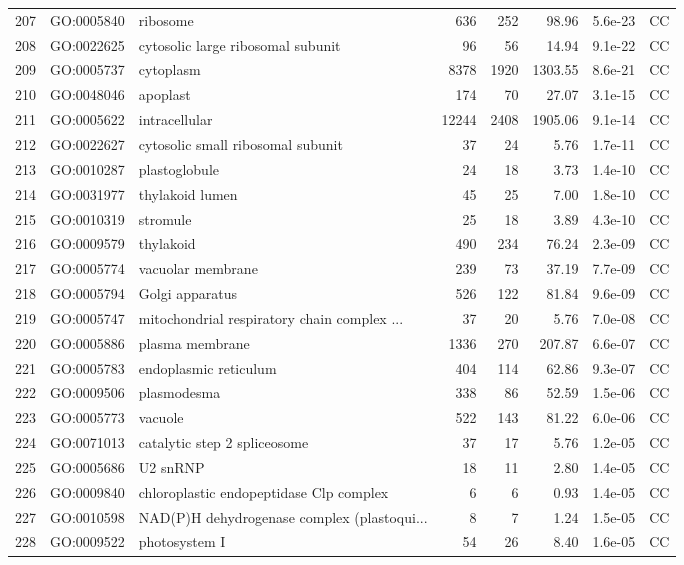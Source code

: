 \documentclass[12pt,oneside,a4paper]{article}
\begin{document}
\begin{longtable}{rllrrrll}
  207 & GO:0005840 & ribosome & 636 & 252 & 98.96 & 5.6e-23 & CC \\ 
  208 & GO:0022625 & cytosolic large ribosomal subunit &  96 &  56 & 14.94 & 9.1e-22 & CC \\ 
  209 & GO:0005737 & cytoplasm & 8378 & 1920 & 1303.55 & 8.6e-21 & CC \\ 
  210 & GO:0048046 & apoplast & 174 &  70 & 27.07 & 3.1e-15 & CC \\ 
  211 & GO:0005622 & intracellular & 12244 & 2408 & 1905.06 & 9.1e-14 & CC \\ 
  212 & GO:0022627 & cytosolic small ribosomal subunit &  37 &  24 & 5.76 & 1.7e-11 & CC \\ 
  213 & GO:0010287 & plastoglobule &  24 &  18 & 3.73 & 1.4e-10 & CC \\ 
  214 & GO:0031977 & thylakoid lumen &  45 &  25 & 7.00 & 1.8e-10 & CC \\ 
  215 & GO:0010319 & stromule &  25 &  18 & 3.89 & 4.3e-10 & CC \\ 
  216 & GO:0009579 & thylakoid & 490 & 234 & 76.24 & 2.3e-09 & CC \\ 
  217 & GO:0005774 & vacuolar membrane & 239 &  73 & 37.19 & 7.7e-09 & CC \\ 
  218 & GO:0005794 & Golgi apparatus & 526 & 122 & 81.84 & 9.6e-09 & CC \\ 
  219 & GO:0005747 & mitochondrial respiratory chain complex ... &  37 &  20 & 5.76 & 7.0e-08 & CC \\ 
  220 & GO:0005886 & plasma membrane & 1336 & 270 & 207.87 & 6.6e-07 & CC \\ 
  221 & GO:0005783 & endoplasmic reticulum & 404 & 114 & 62.86 & 9.3e-07 & CC \\ 
  222 & GO:0009506 & plasmodesma & 338 &  86 & 52.59 & 1.5e-06 & CC \\ 
  223 & GO:0005773 & vacuole & 522 & 143 & 81.22 & 6.0e-06 & CC \\ 
  224 & GO:0071013 & catalytic step 2 spliceosome &  37 &  17 & 5.76 & 1.2e-05 & CC \\ 
  225 & GO:0005686 & U2 snRNP &  18 &  11 & 2.80 & 1.4e-05 & CC \\ 
  226 & GO:0009840 & chloroplastic endopeptidase Clp complex &   6 &   6 & 0.93 & 1.4e-05 & CC \\ 
  227 & GO:0010598 & NAD(P)H dehydrogenase complex (plastoqui... &   8 &   7 & 1.24 & 1.5e-05 & CC \\ 
  228 & GO:0009522 & photosystem I &  54 &  26 & 8.40 & 1.6e-05 & CC \\ 

\end{longtable}
\end{document}
